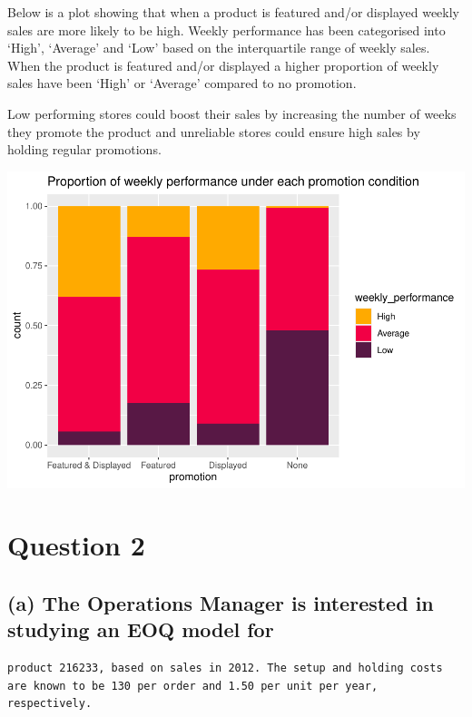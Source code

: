 \documentclass[
  11pt,
]{article}
\begin{document}
Below is a plot showing that when a product is featured and/or displayed
weekly sales are more likely to be high. Weekly performance has been
categorised into `High', `Average' and `Low' based on the interquartile
range of weekly sales. When the product is featured and/or displayed a
higher proportion of weekly sales have been `High' or `Average' compared
to no promotion.

Low performing stores could boost their sales by increasing the number
of weeks they promote the product and unreliable stores could ensure
high sales by holding regular promotions.

\includegraphics{Assignment-STAT702_files/figure-latex/1b-1.pdf}

\hypertarget{question-2}{%
\section{Question 2}\label{question-2}}

\hypertarget{a-the-operations-manager-is-interested-in-studying-an-eoq-model-for}{%
\subsection{(a) The Operations Manager is interested in studying an EOQ
model
for}\label{a-the-operations-manager-is-interested-in-studying-an-eoq-model-for}}

\begin{verbatim}
product 216233, based on sales in 2012. The setup and holding costs
are known to be 130 per order and 1.50 per unit per year,
respectively.
\end{verbatim}
\end{document}
